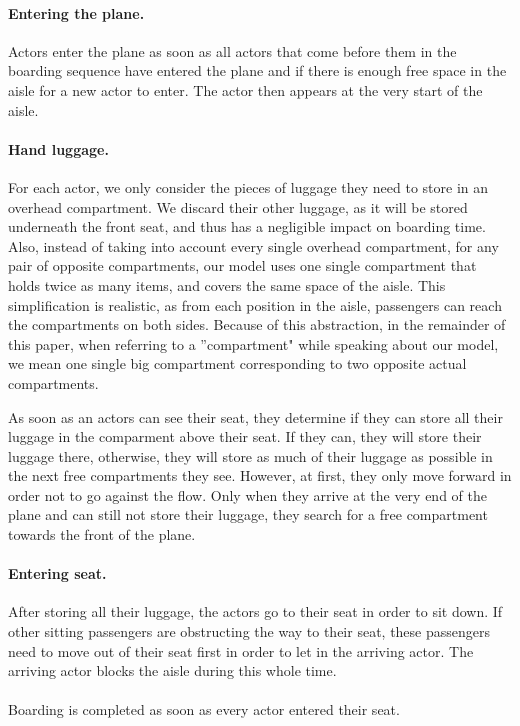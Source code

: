 \documentclass[11pt]{article}
\begin{document}
\paragraph{Entering the plane.}
Actors enter the plane as soon as all actors that come before them in the boarding sequence have entered the plane and if there is enough free space in the aisle for a new actor to enter. The actor then appears at the very start of the aisle.


\paragraph{Hand luggage.}
For each actor, we only consider the pieces of luggage they need to store in an overhead compartment. We discard their other luggage, as it will be stored underneath the front seat, and thus has a negligible impact on boarding time. Also, instead of taking into account every single overhead compartment, for any pair of opposite compartments, our model uses one single compartment that holds twice as many items, and covers the same space of the aisle. This simplification is realistic, as from each position in the aisle, passengers can reach the compartments on both sides. Because of this abstraction, in the remainder of this paper, when referring to a ''compartment" while speaking about our model, we mean one single big compartment corresponding to two opposite actual compartments.

	As soon as an actors can see their seat, they determine if they can store all their luggage in the comparment above their seat. If they can, they will store their luggage there, otherwise, they will store as much of their luggage as possible in the next free compartments they see. However, at first, they only move forward in order not to go against the flow. Only when they arrive at the very end of the plane and can still not store their luggage, they search for a free compartment towards the front of the plane.


\paragraph{Entering seat.}
After storing all their luggage, the actors go to their seat in order to sit down. If other sitting passengers are obstructing the way to their seat, these passengers need to move out of their seat first in order to let in the arriving actor. The arriving actor blocks the aisle during this whole time.
\\\\
Boarding is completed as soon as every actor entered their seat.
\end{document}
